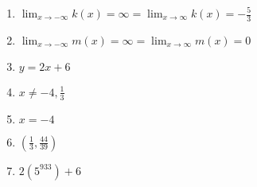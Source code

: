 \begin{enumerate}
    \item $\displaystyle \lim_{x \to -\infty} k(x) = \infty = \lim_{x \to \infty} k(x) = -\frac{5}{3}$
    \item $\displaystyle \lim_{x \to -\infty} m(x) = \infty = \lim_{x \to \infty} m(x) = 0$
    
    \item $y = 2x + 6$
    \item $x \neq -4, \frac{1}{3}$
    \item $x = -4$
    \item $\left(\frac{1}{3}, \frac{44}{39}\right)$
    \item $2\left(5^{933}\right) + 6$
\end{enumerate}
